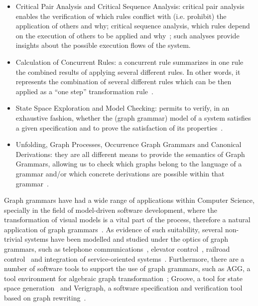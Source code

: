 \begin{itemize}
  \item Critical Pair Analysis and Critical Sequence Analysis: critical pair analysis enables the verification of which rules conflict with (i.e. prohibit) the application of others and why; critical sequence analysis, which rules depend on the execution of others to be applied and why~\cite{Lambers2008a}; such analyses provide insights about the possible execution flows of the system.
  \item Calculation of Concurrent Rules: a concurrent rule summarizes in one rule the combined results of applying several different rules. In other words, it represents the combination of several different rules which can be then applied as a ``one step'' transformation rule~\cite{Lambers2008,BezerraETMF2016}.
  \item State Space Exploration and Model Checking: permits to verify, in an exhaustive fashion, whether the (graph grammar) model of a system satisfies a given specification and to prove the satisfaction of its properties~\cite{Rensink2004}.
  \item Unfolding, Graph Processes, Occurrence Graph Grammars and Canonical Derivations: they are all different means to provide the semantics of Graph Grammars, allowing us to check which graphs belong to the language of a grammar and/or which concrete derivations are possible within that grammar~\cite{Corradini1996,Ribeiro1996}.
\end{itemize}

Graph grammars have had a wide range of applications within Computer Science, specially in the field of model-driven software development, where the transformation of visual models is a vital part of the process, therefore a natural application of graph grammars~\cite{Rozenberg1997}.
As evidence of such suitability, several non-trivial systems have been modelled and studied under the optics of graph grammars, such as telephone communications~\cite{Ribeiro1996}, elevator control~\cite{Lambers2010}, railroad control~\cite{Pennemann2009} and integration of service-oriented systems~\cite{Giese2015}.
Furthermore, there are a number of software tools to support the use of graph grammars, such as AGG, a tool environment for algebraic graph transformation~\cite{Taentzer2000}; Groove, a tool for state space generation~\cite{Rensink2004} and Verigraph, a software specification and verification tool based on graph rewriting~\cite{verigraph}.

